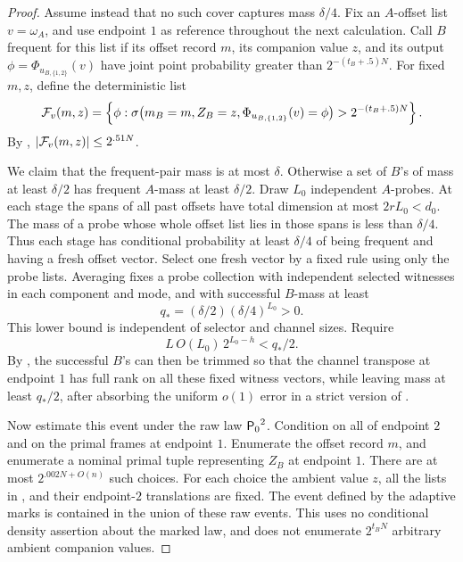 \begin{proof}
Assume instead that no such cover captures mass \(\delta/4\).
Fix an \(A\)-offset list \(v=\omega_A\), and use endpoint \(1\)
as reference throughout the next calculation.  Call \(B\)
frequent for this list if its offset record \(m\), its companion
value \(z\), and its output \(\phi=\Phi_{u_{B,\{1,2\}}}(v)\)
have joint point probability greater than
\(2^{-(t_B+.5)N}\).  For fixed \(m,z\), define the deterministic
list
\begin{equation}
 {\cal F}_v(m,z)=
 \left\{\phi:
  \sigma\bigl(m_B=m,Z_B=z,
       \Phi_{u_{B,\{1,2\}}}(v)=\phi\bigr)
       >2^{-(t_B+.5)N}\right\}.
 \label{eq:frequent-list}
\end{equation}
By ,
\(\lvert {\cal F}_v(m,z)\rvert\le2^{.51N}\).

We claim that the frequent-pair mass is at most \(\delta\).
Otherwise a set of \(B\)'s of mass at least \(\delta/2\) has
frequent \(A\)-mass at least \(\delta/2\).  Draw \(L_0\)
independent \(A\)-probes.  At each stage the spans of all past
offsets have total dimension at most \(2rL_0<d_0\).  The mass
of a probe whose whole offset list lies in those spans is
less than \(\delta/4\).  Thus each stage has conditional
probability at least \(\delta/4\) of being frequent and having
a fresh offset vector.  Select one fresh vector by a fixed
rule using only the probe lists.  Averaging fixes a probe
collection with independent selected witnesses in each
component and mode, and with successful \(B\)-mass at least
\begin{equation}
 q_*=(\delta/2)(\delta/4)^{L_0}>0.
 \label{eq:fresh-probe-mass}
\end{equation}
This lower bound is independent of selector and channel sizes.
Require
\begin{equation}
 L\,O(L_0)\,2^{L_0-h}<q_*/2.
 \label{eq:early-h-probes}
\end{equation}
By , the successful \(B\)'s can
then be trimmed so that the channel
transpose at endpoint \(1\) has full rank on all these fixed
witness vectors, while leaving mass at least \(q_*/2\), after absorbing the uniform
\(o(1)\) error in a strict version of .

Now estimate this event under the raw law \({\mathsf P_0}^2\).
Condition on all of endpoint \(2\) and on the primal frames
at endpoint \(1\).  Enumerate the offset record \(m\), and
enumerate a nominal primal tuple representing \(Z_B\) at
endpoint \(1\).  There are at most \(2^{.002N+O(n)}\) such
choices.  For each choice the ambient value \(z\), all the
lists in , and their endpoint-\(2\)
translations are fixed.  The event defined by the adaptive
marks is contained in the union of these raw events.  This
uses no conditional density assertion about the marked law,
and does not enumerate \(2^{t_BN}\) arbitrary ambient
companion values.


\end{proof}
